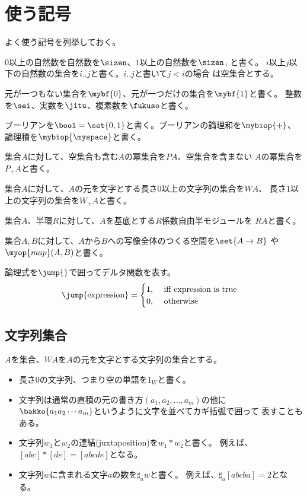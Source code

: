 \begingroup %
	\newcommand{\dup}{\myop{dup}}
	\newcommand{\myid}{\myop{id}}
\section{使う記号}\label{s1:使う記号} %
	よく使う記号を列挙しておく。
	\begin{description}\setlength{\itemsep}{-1mm} %
		\item[自然数]
		$0$以上の自然数を自然数を$\sizen$、$1$以上の自然数を$\sizen_+$と書く。
		$i$以上$j$以下の自然数の集合を$i..j$と書く。$i..j$と書いて$j<i$の場合
		は空集合とする。
		\item[よく使う集合]
		元が一つもない集合を$\mybf{0}$、元が一つだけの集合を$\mybf{1}$と書く。
		整数を$\sei$、実数を$\jitu$、複素数を$\fukuso$と書く。
		\item[ブーリアン]
		ブーリアンを$\bool=\set{0,1}$と書く。ブーリアンの論理和を$\mybiop{+}$、
		論理積を$\mybiop{\myspace}$と書く。
		\item[冪集合]
		集合$A$に対して、空集合も含む$A$の冪集合を$PA$、空集合を含まない
		$A$の冪集合を$P_+A$と書く。
		\item[文字列集合]
		集合$A$に対して、$A$の元を文字とする長さ$0$以上の文字列の集合を$WA$、
		長さ$1$以上の文字列の集合を$W_+A$と書く。
		\item[半モジュール]
		集合$A$、半環$R$に対して、$A$を基底とする$R$係数自由半モジュールを
		$RA$と書く。
		\item[写像]
		集合$A,B$に対して、$A$から$B$への写像全体のつくる空間を$\set{A\to B}$
		や$\myop{map}(A,B)$と書く。
		\item[デルタ関数]
		論理式を$\jump{}$で囲ってデルタ関数を表す。
		\begin{equation*}\begin{split} %
			\jump{\text{expression}} &= \begin{cases}
				1, &\text{ iff }\text{expression is true} \\
				0, &\text{ otherwise } \\
			\end{cases}
		\end{split}\end{equation*} %
	\end{description} %

\subsection{文字列集合}\label{s2:文字列集合} %
	$A$を集合、$WA$を$A$の元を文字とする文字列の集合とする。
	\begin{itemize}\setlength{\itemsep}{-1mm} %
		\item 長さ$0$の文字列、つまり空の単語を$1_W$と書く。
		\item 文字列は通常の直積の元の書き方$(a_1,a_2,\dots,a_m)$の他に
		$\bakko{a_1a_2\cdots a_m}$というように文字を並べてカギ括弧で囲って
		表すこともある。
		\item 文字列$w_1$と$w_2$の連結(juxtaposition)を$w_1*w_2$と書く。
		例えば、$[abc]*[de]=[abcde]$となる。
		\item 文字列$w$に含まれる文字$a$の数を$\sharp_aw$と書く。
		例えば、$\sharp_a[abcba]=2$となる。
	\end{itemize} %

